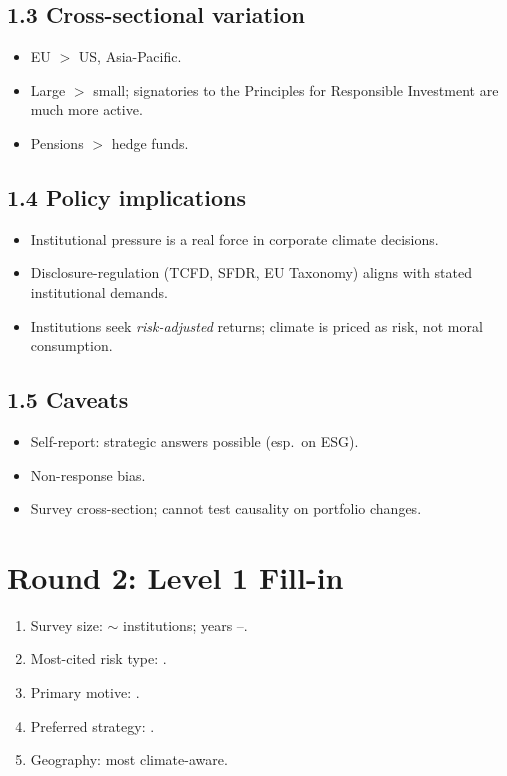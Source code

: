 \documentclass[11pt]{article}
\newcommand{\blank}[1]{\underline{\hspace{#1}}}
\begin{document}
\subsection*{1.3 Cross-sectional variation}
\begin{itemize}
\item EU $>$ US, Asia-Pacific.
\item Large $>$ small; signatories to the Principles for Responsible Investment are much more active.
\item Pensions $>$ hedge funds.
\end{itemize}

\subsection*{1.4 Policy implications}
\begin{itemize}
\item Institutional pressure is a real force in corporate climate decisions.
\item Disclosure-regulation (TCFD, SFDR, EU Taxonomy) aligns with stated institutional demands.
\item Institutions seek \emph{risk-adjusted} returns; climate is priced as risk, not moral consumption.
\end{itemize}

\subsection*{1.5 Caveats}
\begin{alertbox}
\begin{itemize}
\item Self-report: strategic answers possible (esp.\ on ESG).
\item Non-response bias.
\item Survey cross-section; cannot test causality on portfolio changes.
\end{itemize}
\end{alertbox}

\section*{Round 2: Level 1 Fill-in}
\begin{enumerate}
\item Survey size: $\sim$\blank{1cm} institutions; years \blank{1cm}--\blank{1cm}.
\item Most-cited risk type: \blank{2cm}.
\item Primary motive: \blank{2cm}.
\item Preferred strategy: \blank{2cm}.
\item Geography: \blank{1cm} most climate-aware.
\end{enumerate}
\end{document}
